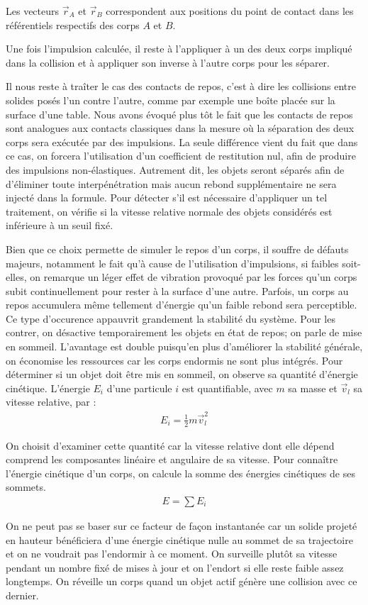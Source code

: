 Les vecteurs $\vec{r}_A$ et $\vec{r}_B$ correspondent aux positions du
point de contact dans les référentiels respectifs des corps $A$ et $B$.

Une fois l'impulsion calculée, il reste à l'appliquer à un des deux
corps impliqué dans la collision et à appliquer son inverse à l'autre
corps pour les séparer.

Il nous reste à traîter le cas des contacts de repos, c'est à dire les
collisions entre solides posés l'un contre l'autre, comme par exemple
une boîte placée sur la surface d'une table. Nous avons évoqué plus
tôt le fait que les contacts de repos sont analogues aux contacts
classiques dans la mesure o\`u la séparation des deux corps sera
exécutée par des impulsions. La seule différence vient du fait que
dans ce cas, on forcera l'utilisation d'un coefficient de restitution
nul, afin de produire des impulsions non-élastiques. Autrement dit,
les objets seront séparés afin de d'éliminer toute interpénétration
mais aucun rebond supplémentaire ne sera injecté dans la formule. Pour
détecter s'il est nécessaire d'appliquer un tel traitement, on vérifie
si la vitesse relative normale des objets considérés est inférieure à
un seuil fixé.

Bien que ce choix permette de simuler le repos d'un corps, il souffre
de défauts majeurs, notamment le fait qu'à cause de l'utilisation
d'impulsions, si faibles soit-elles, on remarque un léger effet de
vibration provoqué par les forces qu'un corps subit continuellement
pour rester à la surface d'une autre. Parfois, un corps au repos
accumulera même tellement d'énergie qu'un faible rebond sera
perceptible. Ce type d'occurence appauvrit grandement la stabilité du
système. Pour les contrer, on désactive temporairement les objets en
état de repos; on parle de mise en sommeil. L'avantage est double
puisqu'en plus d'améliorer la stabilité générale, on économise les
ressources car les corps endormis ne sont plus intégrés. Pour
déterminer si un objet doit être mis en sommeil, on observe sa
quantité d'énergie cinétique. L'énergie $E_i$ d'une particule $i$ est
quantifiable, avec $m$ sa masse et $\vec{v}_l$ sa vitesse relative,
par :
\begin{align*}
  E_i = \frac{1}{2} m \vec{v}^{ 2}_l
\end{align*}

On choisit d'examiner cette quantité car la vitesse relative dont elle
dépend comprend les composantes linéaire et angulaire de sa
vitesse. Pour connaître l'énergie cinétique d'un corps, on calcule la
somme des énergies cinétiques de ses sommets.
\begin{align*}
  E = \sum E_i
\end{align*}

On ne peut pas se baser sur ce facteur de façon instantanée
car un solide projeté en hauteur bénéficiera d'une énergie cinétique
nulle au sommet de sa trajectoire et on ne voudrait pas l'endormir à
ce moment. On surveille plutôt sa vitesse pendant un nombre fixé de
mises à jour et on l'endort si elle reste faible assez longtemps. On
réveille un corps quand un objet actif génère une collision avec ce
dernier.
